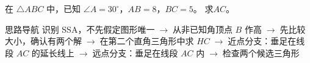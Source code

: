 \documentclass{exam-zh}
\begin{document}






\begin{eduProblemBlock}[例题]
\noindent
\begin{minipage}[t]{\dimexpr\linewidth-70mm-6mm\relax}
\vspace{0pt}
在 $\triangle ABC$ 中，已知 $\angle A=30^\circ$，$AB=8$，$BC=5$。
求$AC$。

\end{minipage}\hfill
\begin{diagramcoltikz}{70mm}{点 $C$ 既要在 $30^\circ$ 射线上，又要满足到 $B$ 的距离为 $5$；先判断这样的位置是否唯一。}
}
\end{diagramcoltikz}
\end{eduProblemBlock}





\begin{eduAuxItem}{思路导航}
识别 SSA，不先假定图形唯一$\;\to\;$从非已知角顶点 $B$ 作高$\;\to\;$先比较大小，确认有两个解$\;\to\;$在第二个直角三角形中求 $HC$$\;\to\;$近点分支：垂足在线段 $AC$ 的延长线上$\;\to\;$远点分支：垂足在线段 $AC$ 内$\;\to\;$检查两个候选三角形\end{eduAuxItem}
\end{document}
